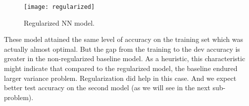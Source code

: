 \begin{answer}
\begin{figure}[H]
	\centering
	\texttt{[image: regularized]}
	\caption{Regularized NN model.}
\end{figure}
These model attained the same level of accuracy on the training set which was actually almost optimal. But the gap from the training to the dev accuracy is greater in the non-regularized baseline model. As a heuristic, this characteristic might indicate that compared to the regularized model, the baseline endured larger variance problem. Regularization did help in this case. And we expect better test accuracy on the second model (as we will see in the next sub-problem). \\
\end{answer}

   
  
